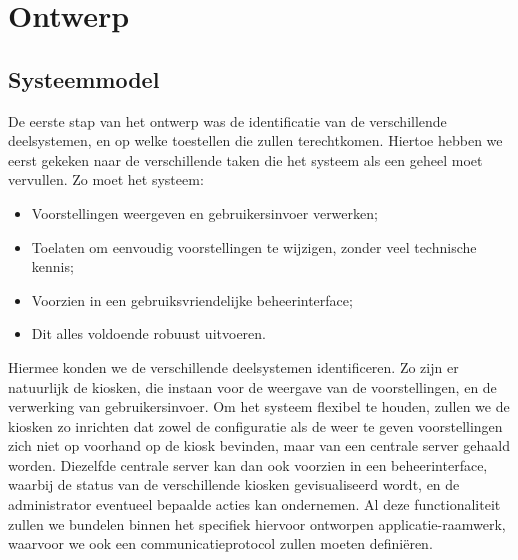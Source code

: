 \part{Ontwerp}
\label{ontwerp}

%
%

\chapter{Systeemmodel}
\label{ontwerp:systeemmodel}

De eerste stap van het ontwerp was de identificatie van de verschillende deelsystemen, en op welke toestellen die zullen terechtkomen. Hiertoe hebben we eerst gekeken naar de verschillende taken die het systeem als een geheel moet vervullen. Zo moet het systeem:
\begin{itemize}
\item Voorstellingen weergeven en gebruikersinvoer verwerken;
\item Toelaten om eenvoudig voorstellingen te wijzigen, zonder veel technische kennis;
\item Voorzien in een gebruiksvriendelijke beheerinterface;
\item Dit alles voldoende robuust uitvoeren.
\end{itemize}

Hiermee konden we de verschillende deelsystemen identificeren. Zo zijn er natuurlijk de kiosken, die instaan voor de weergave van de voorstellingen, en de verwerking van gebruikersinvoer. Om het systeem flexibel te houden, zullen we de kiosken zo inrichten dat zowel de configuratie als de weer te geven voorstellingen zich niet op voorhand op de kiosk bevinden, maar van een centrale server gehaald worden. Diezelfde centrale server kan dan ook voorzien in een beheerinterface, waarbij de status van de verschillende kiosken gevisualiseerd wordt, en de administrator eventueel bepaalde acties kan ondernemen. Al deze functionaliteit zullen we bundelen binnen het specifiek hiervoor ontworpen applicatie-raamwerk, waarvoor we ook een communicatieprotocol zullen moeten definiëren.

